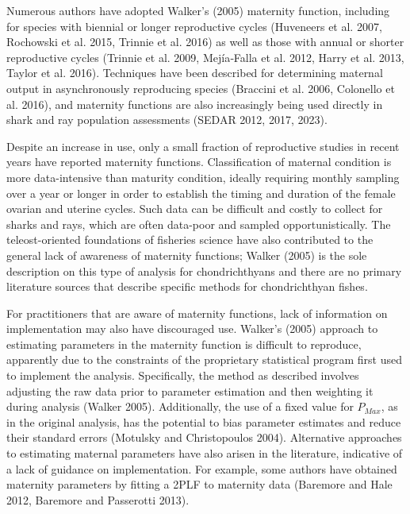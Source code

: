 \documentclass[
]{article}
\begin{document}
Numerous authors have adopted Walker's (2005) maternity function, including for species with biennial or longer reproductive cycles (Huveneers et al. 2007, Rochowski et al. 2015, Trinnie et al. 2016) as well as those with annual or shorter reproductive cycles (Trinnie et al. 2009, Mejía‐Falla et al. 2012, Harry et al. 2013, Taylor et al. 2016). Techniques have been described for determining maternal output in asynchronously reproducing species (Braccini et al. 2006, Colonello et al. 2016), and maternity functions are also increasingly being used directly in shark and ray population assessments (SEDAR 2012, 2017, 2023).

Despite an increase in use, only a small fraction of reproductive studies in recent years have reported maternity functions. Classification of maternal condition is more data-intensive than maturity condition, ideally requiring monthly sampling over a year or longer in order to establish the timing and duration of the female ovarian and uterine cycles. Such data can be difficult and costly to collect for sharks and rays, which are often data-poor and sampled opportunistically. The teleost-oriented foundations of fisheries science have also contributed to the general lack of awareness of maternity functions; Walker (2005) is the sole description on this type of analysis for chondrichthyans and there are no primary literature sources that describe specific methods for chondrichthyan fishes.

For practitioners that are aware of maternity functions, lack of information on implementation may also have discouraged use. Walker's (2005) approach to estimating parameters in the maternity function is difficult to reproduce, apparently due to the constraints of the proprietary statistical program first used to implement the analysis. Specifically, the method as described involves adjusting the raw data prior to parameter estimation and then weighting it during analysis (Walker 2005). Additionally, the use of a fixed value for \(P_{Max}\), as in the original analysis, has the potential to bias parameter estimates and reduce their standard errors (Motulsky and Christopoulos 2004). Alternative approaches to estimating maternal parameters have also arisen in the literature, indicative of a lack of guidance on implementation. For example, some authors have obtained maternity parameters by fitting a 2PLF to maternity data (Baremore and Hale 2012, Baremore and Passerotti 2013).
\end{document}
